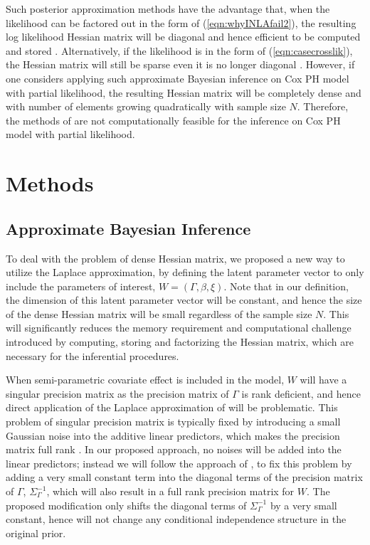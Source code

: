 \documentclass[ba]{imsart}
\begin{document}
Such posterior approximation methods have the advantage that, when the likelihood can be factored out in the form of (\ref{eqn:whyINLAfail2}), the resulting log likelihood Hessian matrix will be diagonal and hence efficient to be computed and stored \citep{inla}. Alternatively, if the likelihood is in the form of (\ref{eqn:casecrosslik}), the Hessian matrix will still be sparse even it is no longer diagonal \citep{casecross}. However, if one considers applying such approximate Bayesian inference on Cox PH model with partial likelihood, the resulting Hessian matrix will be completely dense and with number of elements growing quadratically with sample size $N$. Therefore, the methods of \cite{inla,inlacoxph,casecross} are not computationally feasible for the inference on Cox PH model with partial likelihood. 

\section{Methods}\label{sec:method}


\subsection{Approximate Bayesian Inference}


To deal with the problem of dense Hessian matrix, we proposed a new way to utilize the Laplace approximation, by defining the latent parameter vector to only include the parameters of interest, $W = (\Gamma, \beta, \xi)$. Note that in our definition, the dimension of this latent parameter vector will be constant, and hence the size of the dense Hessian matrix will be small regardless of the sample size $N$. This will significantly reduces the memory requirement and computational challenge introduced by computing, storing and factorizing the Hessian matrix, which are necessary for the inferential procedures. 

When semi-parametric covariate effect is included in the model, $W$ will have a singular precision matrix as the precision matrix of $\Gamma$ is rank deficient, and hence direct application of the Laplace approximation of \cite{tierney} will be problematic. This problem of singular precision matrix is typically fixed by introducing a small Gaussian noise into the additive linear predictors, which makes the precision matrix full rank \citep{casecross, inla}. In our proposed approach, no noises will be added into the linear predictors; instead we will follow the approach of \cite{wood2011fast}, to fix this problem by adding a very small constant term into the diagonal terms of the precision matrix of $\Gamma$, $\Sigma^{-1}_\Gamma$, which will also result in a full rank precision matrix for $W$. 
The proposed modification only shifts the diagonal terms of $\Sigma^{-1}_\Gamma$ by a very small constant, hence will not change any conditional independence structure in the original prior.
\end{document}
